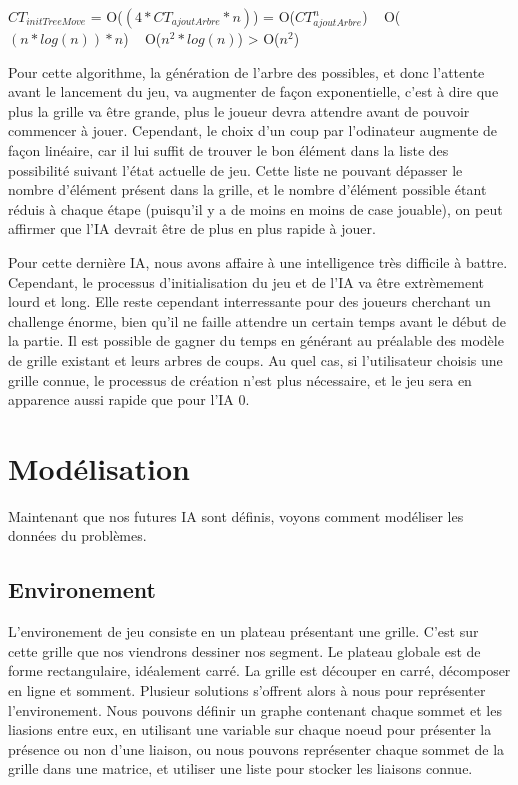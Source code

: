 \documentclass[a4paper,12pt]{report}
\begin{document}
$CT_{initTreeMove}$ = O($(4*CT_{ajoutArbre}*n)$) = O($CT_{ajoutArbre}^n$) ~ O($(n*log(n))*n$) ~ O($n^2*log(n)$) > O($n^2$)

Pour cette algorithme, la g\'en\'eration de l'arbre des possibles, et donc l'attente avant le lancement du jeu, va augmenter de fa\c{c}on exponentielle, c'est \`a dire que plus la grille va \^etre grande, plus le joueur devra attendre avant de pouvoir commencer \`a jouer. Cependant, le choix d'un coup par l'odinateur augmente de fa\c{c}on lin\'eaire, car il lui suffit de trouver le bon \'el\'ement dans la liste des possibilit\'e suivant l'\'etat actuelle de jeu. Cette liste ne pouvant d\'epasser le nombre d'\'el\'ement pr\'esent dans la grille, et le nombre d'\'el\'ement possible \'etant r\'eduis \`a chaque \'etape (puisqu'il y a de moins en moins de case jouable), on peut affirmer que l'IA devrait \^etre de plus en plus rapide \`a jouer.

Pour cette derni\`ere IA, nous avons affaire \`a une intelligence tr\`es difficile \`a battre. Cependant, le processus d'initialisation du jeu et de l'IA va \^etre extr\`emement lourd et long. Elle reste cependant interressante pour des joueurs cherchant un challenge \'enorme, bien qu'il ne faille attendre un certain temps avant le d\'ebut de la partie. Il est possible de gagner du temps en g\'en\'erant au pr\'ealable des mod\`ele de grille existant et leurs arbres de coups. Au quel cas, si l'utilisateur choisis une grille connue, le processus de cr\'eation n'est plus n\'ecessaire, et le jeu sera en apparence aussi rapide que pour l'IA 0. 



\part{Mod\'elisation}

Maintenant que nos futures IA sont d\'efinis, voyons comment mod\'eliser les donn\'ees du probl\`emes.

\chapter{Environement}

L'environement de jeu consiste en un plateau pr\'esentant une grille. C'est sur cette grille que nos viendrons dessiner nos segment. Le plateau globale est de forme rectangulaire, id\'ealement carr\'e. La grille est d\'ecouper en carr\'e, d\'ecomposer en ligne et somment. Plusieur solutions s'offrent alors \`a nous pour repr\'esenter l'environement. Nous pouvons d\'efinir un graphe contenant chaque sommet et les liasions entre eux, en utilisant une variable sur chaque noeud pour pr\'esenter la pr\'esence ou non d'une liaison, ou nous pouvons repr\'esenter chaque sommet de la grille dans une matrice, et utiliser une liste pour stocker les liaisons connue. \\
\end{document}
